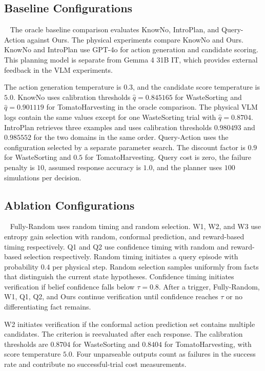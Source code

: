 \subsection{Baseline Configurations}~\label{appx:baseline_configs}
The oracle baseline comparison evaluates KnowNo, IntroPlan, and Query-Action against Ours. The physical experiments compare KnowNo and Ours. KnowNo and IntroPlan use GPT-4o for action generation and candidate scoring. This planning model is separate from Gemma 4 31B IT, which provides external feedback in the VLM experiments.

The action generation temperature is $0.3$, and the candidate score temperature is $5.0$. KnowNo uses calibration thresholds $\hat{q}=0.845165$ for WasteSorting and $\hat{q}=0.901119$ for TomatoHarvesting in the oracle comparison. The physical VLM logs contain the same values except for one WasteSorting trial with $\hat{q}=0.8704$. IntroPlan retrieves three examples and uses calibration thresholds $0.980493$ and $0.985552$ for the two domains in the same order. Query-Action uses the configuration selected by a separate parameter search. The discount factor is $0.9$ for WasteSorting and $0.5$ for TomatoHarvesting. Query cost is zero, the failure penalty is $10$, assumed response accuracy is $1.0$, and the planner uses $100$ simulations per decision.

\subsection{Ablation Configurations}~\label{appx:ablation_configs}
Fully-Random uses random timing and random selection. W1, W2, and W3 use entropy gain selection with random, conformal prediction, and reward-based timing respectively. Q1 and Q2 use confidence timing with random and reward-based selection respectively. Random timing initiates a query episode with probability $0.4$ per physical step. Random selection samples uniformly from facts that distinguish the current state hypotheses. Confidence timing initiates verification if belief confidence falls below $\tau=0.8$. After a trigger, Fully-Random, W1, Q1, Q2, and Ours continue verification until confidence reaches $\tau$ or no differentiating fact remains.

W2 initiates verification if the conformal action prediction set contains multiple candidates. The criterion is reevaluated after each response. The calibration thresholds are $0.8704$ for WasteSorting and $0.8404$ for TomatoHarvesting, with score temperature $5.0$. Four unparseable outputs count as failures in the success rate and contribute no successful-trial cost measurements.

